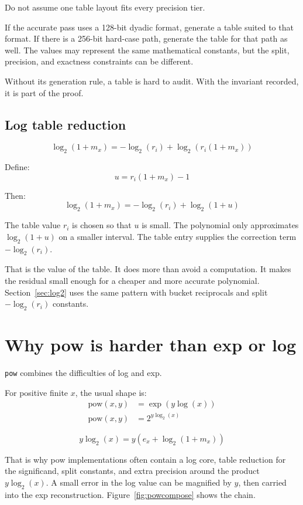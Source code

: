 \documentclass[manuscript, nonacm]{acmart}
\begin{document}
  Do not assume one table layout fits every precision tier.

  If the accurate pass uses a 128-bit dyadic format, generate a table suited to
  that format. If there is a 256-bit hard-case path, generate the table for
  that path as well. The values may represent the same mathematical constants,
  but the split, precision, and exactness constraints can be different.

  Without its generation rule, a table is hard to audit. With the invariant
  recorded, it is part of the proof.

  \subsection{Log table reduction}

  \[ \log_2(1 + m_x) = -\log_2(r_i) + \log_2(r_i(1 + m_x)) \]

  Define:
  \[ u = r_i(1 + m_x) - 1 \]

  Then:
  \[ \log_2(1 + m_x) = -\log_2(r_i) + \log_2(1 + u) \]

  The table value $r_i$ is chosen so that $u$ is small. The polynomial only
  approximates $\log_2(1 + u)$ on a smaller interval. The table entry supplies
  the correction term $-\log_2(r_i)$.

  That is the value of the table. It does more than avoid a computation. It
  makes the residual small enough for a cheaper and more accurate polynomial.
  Section~\ref{sec:log2} uses the same pattern with bucket reciprocals and
  split $-\log_2(r_i)$ constants.



  \section{Why pow is harder than exp or log}

  \texttt{pow} combines the difficulties of log and exp.

  For positive finite $x$, the usual shape is:
  \begin{align*}
    \mathrm{pow}(x, y) &= \exp(y \log(x)) \\
    \mathrm{pow}(x, y) &= 2^{y \log_2(x)}
  \end{align*}

  \[ y \log_2(x) = y(e_x + \log_2(1 + m_x)) \]

  That is why pow implementations often contain a log core, table reduction for
  the significand, split constants, and extra precision around the product
  $y \log_2(x)$. A small error in the log value can be magnified by $y$, then
  carried into the exp reconstruction. Figure~\ref{fig:powcompose} shows
  the chain.
\end{document}

